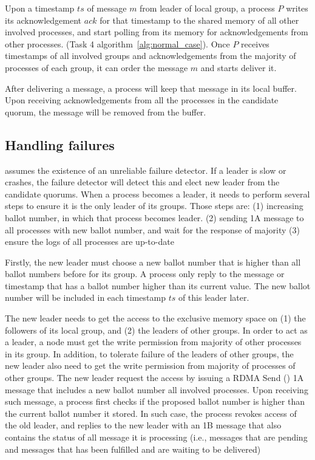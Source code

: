 Upon \lread a timestamp $ts$ of message $m$ from leader of local group, a
process $P$ writes its acknowledgement $ack$ for that timestamp to the shared
memory of all other involved processes, and start polling from its memory for
acknowledgements from other processes. (Task 4 algorithm~\ref{alg:normal_case}).
Once $P$ receives timestamps of all involved groups and acknowledgements from
the majority of processes of each group, it can order the message $m$ and starts
deliver it.

After delivering a message, a process will keep that message in its local buffer.
Upon receiving acknowledgements from all the processes in the candidate
quorum, the message will be removed from the buffer.

\subsection{Handling failures}
\label{sec:failurecase}

%

\libname assumes the existence of an unreliable failure detector. If a leader is
slow or crashes, the failure detector will detect this and elect new leader from
the candidate quorums. When a process becomes a leader, it needs to perform
several steps to ensure it is the only leader of its groups. Those steps are:
(1) increasing ballot number, in which that process becomes leader. (2) sending
1A message to all processes with new ballot number, and wait for the response of
majority (3) ensure the logs of all processes are up-to-date

Firstly, the new leader must choose a new ballot number that is higher than all
ballot numbers before for its group. A process only reply to the message or
timestamp that has a ballot number higher than its current value. The new ballot
number will be included in each timestamp $ts$ of this leader later.

The new leader needs to get the access to the exclusive memory space on (1) the
followers of its local group, and (2) the leaders of other groups. In order to
act as a leader, a node must get the write permission from majority of other
processes in its group. In addition, to tolerate failure of the leaders of other
groups, the new leader also need to get the write permission from majority of
processes of other groups. The new leader request the access by issuing a RDMA
Send () 1A message that includes a new ballot
number all involved processes. Upon receiving such message, a process first
checks if the proposed ballot number is higher than the current ballot number it
stored. In such case, the process revokes access of the old leader, and replies
to the new leader with an 1B message that also contains the status of all
message it is processing (i.e., messages that are pending and messages that has
been fulfilled and are waiting to be delivered)

